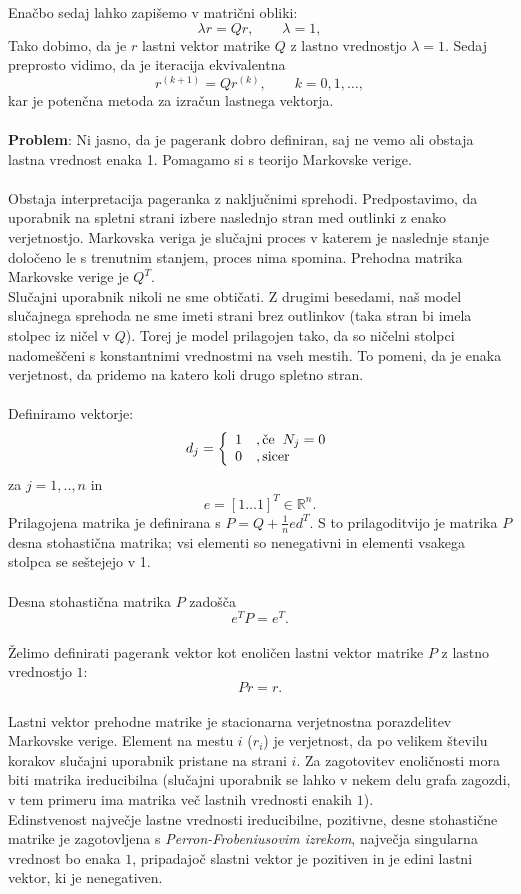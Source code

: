 \documentclass[a4paper]{article}
\begin{document}
Enačbo sedaj lahko zapišemo v matrični obliki:
$$ \lambda r = Qr,     \qquad \lambda = 1,$$
Tako dobimo, da je $r$ lastni vektor matrike $Q$ z lastno vrednostjo $\lambda = 1$. Sedaj preprosto vidimo, da je iteracija ekvivalentna
$$r^{(k+1)} = Qr^{(k)},\qquad  k=0,1,… ,$$
kar je potenčna metoda za izračun lastnega vektorja.\\
\\ \textbf{Problem}: Ni jasno, da je pagerank dobro definiran, saj ne vemo ali obstaja lastna vrednost enaka 1. Pomagamo si s teorijo Markovske verige.\\
\\Obstaja interpretacija pageranka z naključnimi sprehodi. Predpostavimo, da uporabnik na spletni strani izbere naslednjo stran  med outlinki z enako verjetnostjo. Markovska veriga je slučajni proces v katerem je naslednje stanje določeno le s trenutnim stanjem, proces nima spomina. Prehodna matrika Markovske verige je $Q^T$.\\
Slučajni uporabnik nikoli ne sme obtičati. Z drugimi besedami, naš model slučajnega sprehoda ne sme imeti strani brez outlinkov (taka stran bi imela stolpec iz ničel v $Q$). Torej je model prilagojen tako, da so ničelni stolpci nadomeščeni s konstantnimi vrednostmi na vseh mestih. To pomeni, da je enaka verjetnost, da pridemo na katero koli drugo spletno stran. \\ 
\\Definiramo vektorje: \\
\[
d_j = 
\left \{
	\begin{array}{ll}
		1  &, \mbox{če}\hspace{2mm} N_j = 0 \\
		0 &, \mbox{sicer} 
	\end{array}
\right. \]
za $j = 1, .., n$ in
$$e = [1 … 1] ^T \in \mathbb{R}^n.$$
Prilagojena matrika je definirana s $ P = Q + \frac{1}{n}ed^T$. 
S to prilagoditvijo je matrika $P$ desna stohastična matrika; vsi elementi so nenegativni in elementi vsakega stolpca se seštejejo v 1. \\
\\Desna stohastična matrika $P$ zadošča 
$$e^TP = e^T.$$ \\
Želimo definirati pagerank vektor kot enoličen lastni vektor matrike $P$ z lastno vrednostjo $1$:
$$Pr=r.$$ \\
Lastni vektor prehodne matrike je stacionarna verjetnostna porazdelitev Markovske verige. Element na mestu $i$ ($r_i$) je verjetnost, da po velikem številu korakov slučajni uporabnik pristane na strani $i$. Za zagotovitev enoličnosti mora biti matrika ireducibilna (slučajni uporabnik se lahko v nekem delu grafa zagozdi, v tem primeru ima matrika več lastnih vrednosti enakih $1$). \\ Edinstvenost največje lastne vrednosti ireducibilne, pozitivne, desne stohastične matrike je zagotovljena s \textit{Perron-Frobeniusovim izrekom}, največja singularna vrednost bo enaka $1$, pripadajoč slastni vektor je pozitiven in je edini lastni vektor, ki je nenegativen. \\
\end{document}
